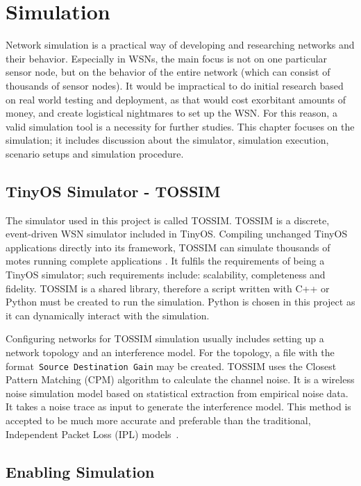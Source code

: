 \chapter{Simulation}
\label{Sim}
Network simulation is a practical way of developing and researching networks and their
behavior. Especially in WSNs, the main focus is not on one particular sensor node, but on
the behavior of the entire network (which can consist of thousands of sensor nodes). It would
be impractical to do initial research based on real world testing and deployment, as that would cost exorbitant amounts of money, and create logistical nightmares to set up the WSN. For this reason, a valid
simulation tool is a necessity for further studies. This chapter focuses on the simulation; it 
includes discussion about the simulator, simulation execution, scenario setups and simulation procedure.

\section{TinyOS Simulator - TOSSIM}
\label{Sim:TOSSIM}

The simulator used in this project is called TOSSIM\@. TOSSIM is a discrete, event-driven WSN simulator included in TinyOS. Compiling unchanged TinyOS applications
directly into its framework, TOSSIM can simulate thousands of motes running complete
applications \cite{LLWC}. It fulfils the requirements of being a TinyOS simulator; such requirements include: scalability, completeness and fidelity. TOSSIM is a shared library, therefore a script written with C++ or Python must be created to run the simulation.  Python is chosen in this project as it can dynamically interact with the simulation.
\newline

Configuring networks for TOSSIM simulation usually includes setting
up a network topology and an interference model. For the topology, a file with the format~\texttt{Source Destination Gain} may be created. TOSSIM uses the Closest Pattern Matching (CPM) algorithm to calculate the channel noise. It is a wireless noise simulation model
based on statistical extraction from empirical noise data. It takes a noise trace as input to generate the interference model. This method is accepted to be much more accurate and preferable than the traditional, Independent Packet Loss (IPL) models~\cite{TOSSIM}.

\section{Enabling Simulation}
\label{Sim:Enabling}

